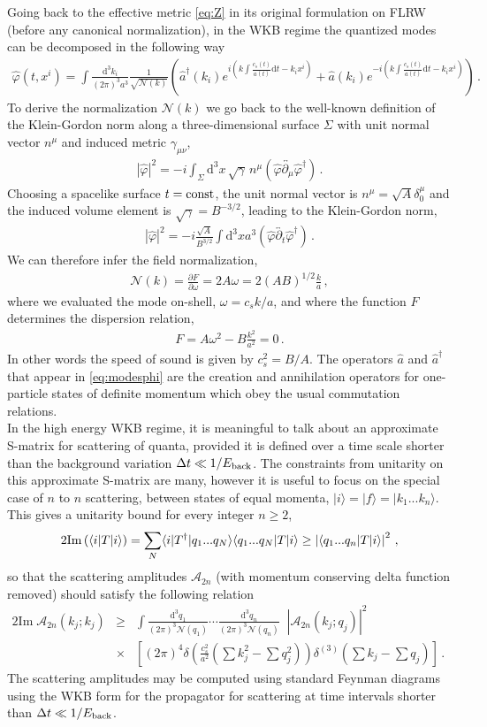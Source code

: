 \documentclass[12pt]{article}
\newcommand{\A}{\mathcal{A}}
\def\ba{\begin{eqnarray}}
\def\ea{\end{eqnarray}}
\def\d{\mathrm{d}}
\def\({\left(}
\def\){\right)}
\def\nn{\nonumber}
\def\p{\partial}
\def\p{\partial}
\def\A{\mathcal{A}}
\begin{document}
Going back to the effective metric \eqref{eq:Z} in its original formulation on FLRW (before any canonical normalization), in the WKB regime the quantized modes can be decomposed in the following way
\ba
\label{eq:modesphi}
\hat \varphi(t,x^i)=\int \frac{\d^3 k_i}{(2\pi)^3 a^3 }\frac{1}{\sqrt{\mathcal{N} (k) }}\(\hat a^\dagger(k_i)e^{i (k \int \frac{c_s(t)}{a(t)} \d t - k_i x^i)}
+ \hat a(k_i)e^{-i (k \int \frac{c_s(t)}{a(t)} \d t - k_i x^i)} \)\,.
\ea
To derive the normalization  $\mathcal{N}(k)$ we go back to the well-known definition of the Klein-Gordon norm along a three-dimensional surface $\Sigma$ with unit normal vector $n^\mu$ and induced metric $\gamma_{\mu\nu}$,
\ba
|\hat \varphi|^2=-i \int_{\Sigma}\d^3x\,  \sqrt{\gamma}\,  n^\mu \(\hat \varphi \overleftrightarrow{\p_\mu} \hat \varphi^\dagger\)\,.
\ea
Choosing a spacelike surface $t={\rm const}$, the unit normal vector is $n^\mu = \sqrt{A} \delta^\mu_0$ and the induced volume element is $\sqrt{\gamma}=B^{-3/2}$, leading to the Klein-Gordon norm,
\ba
|\hat \varphi|^2=-i \frac{\sqrt{A}}{B^{3/2}}\int \d^3 x a^3 \(\hat \varphi \overleftrightarrow{\p_t} \hat \varphi^\dagger\)\,.
\ea
We can therefore infer the field normalization,
\ba
\label{eq:Norm1}
\mathcal{N} (k)= \frac{\p F}{\p \omega} = 2 A \omega=2 (AB)^{1/2} \frac{k}{a} \,,
\ea
where we evaluated the mode on-shell, $\omega=c_s k/a$, and
where the function $F$ determines the dispersion relation,
\ba
\label{eq:DispF1}
F=A \omega^2 - B \frac{k^2}{a^2}=0\,.
\ea
In other words the speed of sound is given by $c_s^2=B/A$. The operators $\hat a$ and $\hat a^\dagger$ that appear in \eqref{eq:modesphi} are the creation and annihilation operators for one-particle states of definite momentum which obey the usual commutation relations.  \\

In the high energy WKB regime, it is meaningful to talk about an approximate S-matrix for scattering of quanta, provided it is defined over a time scale shorter than the background variation  $\Delta t \ll 1/E_{\rm back}$. The constraints from unitarity on this approximate S-matrix are many, however it is useful to focus on the special case of $n$ to $n$ scattering, between states of equal momenta, $| i \rangle= | f \rangle = | k_1 ... k_n \rangle $. This gives a unitarity bound for every integer $n \geq 2$,
\ba
2 {\rm Im} \(\langle i | T | i \rangle\) = \sum_N \langle i | T^\dagger | q_1 ... q_N \rangle \langle q_1... q_N | T | i \rangle \geq \left| \langle q_1...q_n | T | i \rangle \right|^2\,,
\ea
so that the scattering amplitudes $\A_{2n}$ (with momentum conserving delta function removed) should satisfy the following relation
\ba
 2   \text{Im} \; \A_{2n} ( k_j ; k_j  )
&\geq&  \int \frac{\d^3 q_1}{(2 \pi)^3 \mathcal{N}(q_1) } \cdots \frac{\d^3 q_n}{(2 \pi)^3 \mathcal{N}(q_n) } \;\;   | \A_{2n} (k_j ; q_j) |^2   \nn \\
& \times &\left[ (2 \pi)^4 \delta \(\frac{c^2_s}{a^2} \(\sum k^2_j - \sum q^2_j\) \) \delta^{(3)} \(\sum k_j - \sum q_j \) \right]  \,. \quad  \label{eqn:A2n1}
\ea
The scattering amplitudes may be computed using standard Feynman diagrams using the WKB form for the propagator for scattering at time intervals shorter than $\Delta t \ll 1/E_{\rm back}$.\\
\end{document}
